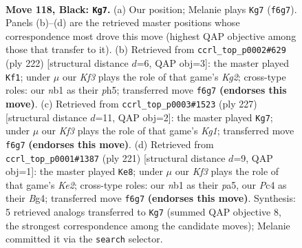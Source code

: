 \documentclass[11pt]{article}
\begin{document}
\clearpage

\begin{figure}[p]\centering
\begin{subfigure}{0.46\textwidth}\centering
\resizebox{\linewidth}{!}{%
\newchessgame
\chessboard[
  setfen={8/8/5k2/2B5/p1p3b1/8/5K2/1N6 b - - 91 118},
  showmover=false,
  pgfstyle=straightmove, color=movearrow, markmove={f6-g7}
]}
\caption{}
\end{subfigure}\hfill
\begin{subfigure}{0.46\textwidth}\centering
\resizebox{\linewidth}{!}{%
\newchessgame
\chessboard[
  setfen={8/1PbB4/8/7p/5k1P/8/6K1/8 w - - 11 112},
  showmover=false,
  pgfstyle=straightmove, color=movearrow, markmove={g2-f1}
]}
\caption{}
\end{subfigure}
\\[4pt]
\begin{subfigure}{0.46\textwidth}\centering
\resizebox{\linewidth}{!}{%
\newchessgame
\chessboard[
  setfen={4b1k1/8/3B4/8/pK6/7p/8/8 b - - 49 114},
  showmover=false,
  pgfstyle=straightmove, color=movearrow, markmove={g8-g7}
]}
\caption{}
\end{subfigure}\hfill
\begin{subfigure}{0.46\textwidth}\centering
\resizebox{\linewidth}{!}{%
\newchessgame
\chessboard[
  setfen={8/B3k3/p7/P7/6b1/7p/8/6K1 b - - 9 111},
  showmover=false,
  pgfstyle=straightmove, color=movearrow, markmove={e7-e8}
]}
\caption{}
\end{subfigure}
\caption{\textbf{Move 118, Black: \texttt{Kg7}.} (a) Our position; Melanie plays \texttt{Kg7} (\texttt{f6g7}). Panels (b)--(d) are the retrieved master positions whose correspondence most drove this move (highest QAP objective among those that transfer to it). (b) Retrieved from \texttt{ccrl\_top\_p0002\#629} (ply 222) [structural distance $d$=6, QAP obj=3]: the master played \texttt{Kf1}; under $\mu$ our \emph{Kf3} plays the role of that game's \emph{Kg2}; cross-type roles: our \emph{n}b1 as their \emph{p}h5; transferred move \texttt{f6g7} \textbf{(endorses this move)}. (c) Retrieved from \texttt{ccrl\_top\_p0003\#1523} (ply 227) [structural distance $d$=11, QAP obj=2]: the master played \texttt{Kg7}; under $\mu$ our \emph{Kf3} plays the role of that game's \emph{Kg1}; transferred move \texttt{f6g7} \textbf{(endorses this move)}. (d) Retrieved from \texttt{ccrl\_top\_p0001\#1387} (ply 221) [structural distance $d$=9, QAP obj=1]: the master played \texttt{Ke8}; under $\mu$ our \emph{Kf3} plays the role of that game's \emph{Ke2}; cross-type roles: our \emph{n}b1 as their \emph{p}a5, our \emph{P}c4 as their \emph{B}g4; transferred move \texttt{f6g7} \textbf{(endorses this move)}. Synthesis: 5 retrieved analogs transferred to \texttt{Kg7} (summed QAP objective 8, the strongest correspondence among the candidate moves); Melanie committed it via the \texttt{search} selector.}
\label{fig:thought-m235}
\end{figure}
\end{document}
